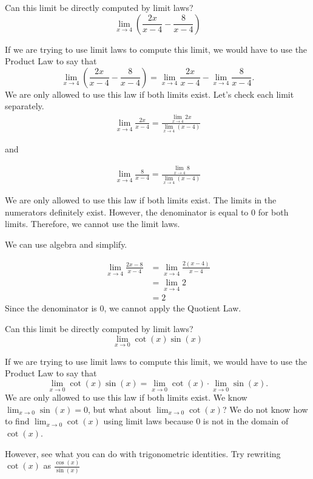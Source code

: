 \documentclass{ximera}
\begin{document}
\begin{question}
  Can this limit be directly computed by limit laws?
  \[
  \displaystyle\lim_{x\to 4}{\left(\frac{2x}{x-4}-\frac{8}{x-4}\right)}
  \]
  \begin{multipleChoice}
  \end{multipleChoice}
  \begin{feedback}
    If we are trying to use limit laws to compute this limit, we would have to use the Product Law to say that
    \[
    \displaystyle\lim_{x\to 4}\left(\frac{2x}{x-4} - \frac{8}{x-4}\right)= \lim_{x\to 4}\frac{2x}{x-4} - \lim_{x\to 4}\frac{8}{x-4}.
    \]
    We are only allowed to use this law if both limits exist.  Let's
    check each limit separately.
    \begin{align*}
      \displaystyle\lim_{x\to 4}\frac{2x}{x-4}=\frac{\lim_{x\to 4}2x}{\lim_{x\to 4}(x-4)}
    \end{align*}

and

    \begin{align*}
      \displaystyle\lim_{x\to 4}\frac{8}{x-4}=\displaystyle\frac{\lim_{x\to 4}8}{\lim_{x\to 4}(x-4)}
    \end{align*}
    
   We are only allowed to use this law if both limits exist. The limits in the numerators definitely
   exist. However, the denominator is equal to $0$ for both limits. Therefore, we cannot use the limit laws. 
   
   We can use algebra and simplify.
   
   \begin{align*}
   \displaystyle\lim_{x\to 4}\frac{2x-8}{x-4}&=\lim_{x\to 4}\frac{2(x-4)}{x-4}\\
   &=\lim_{x\to 4}2\\
   &=2
  \end{align*}
  Since the denominator is $0$, we cannot apply the Quotient Law.
  \end{feedback}
\end{question}

\begin{question}
  Can this limit be directly computed by limit laws?
  \[
  \displaystyle\lim_{x\to 0} \cot(x)\sin(x)
  \]
  \begin{multipleChoice}
  \end{multipleChoice}
  \begin{feedback}
  If we are trying to use limit laws to compute this limit, we would
  have to use the Product Law to say that
  \[
  \displaystyle\lim_{x\to 0} \cot(x)\sin(x) =\lim_{x\to 0} \cot(x) \cdot \lim_{x\to 0}\sin(x).
  \]
  We are only allowed to use this law if both limits exist.  We know
  $\displaystyle\lim_{x\to 0} \sin(x) = 0$, but what about $\displaystyle\lim_{x\to 0}\cot(x)$?  We do
  not know how to find $\lim_{x\to 0}\cot(x)$ using limit laws because $0$
  is not in the domain of $\cot(x)$.
  \end{feedback}
  
  However, see what you can do with trigonometric identities. Try rewriting $\cot(x)$ as $\frac{\cos(x)}{\sin(x)}$
\end{question}
\end{document}
